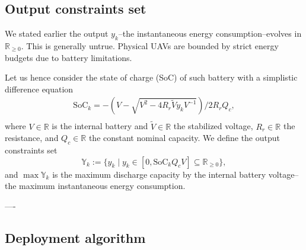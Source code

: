 \documentclass[letterpaper,10pt,conference]{ieeeconf}
\theoremstyle{definition}
\begin{document}
\subsection{Output constraints set}

We stated earlier the output $y_k$--the instantaneous energy consumption--evolves in $\mathbb{R}_{\geq 0}$. This is generally untrue. Physical UAVs are bounded by strict energy budgets due to battery limitations.

Let us hence consider the state of charge (SoC) of such battery with a simplistic difference equation~\cite{seewald2020mechanical}
\begin{equation*}\begin{split}
  \mathrm{SoC}_k=-\left(V-
  \sqrt{
    V^2-
    4R_r\tilde{V}y_kV^{-1}}
  \right)/2R_rQ_c,\\ 
\end{split}\end{equation*}
where $V\in\mathbb{R}$ is the internal battery and $\tilde{V}\in\mathbb{R}$ the stabilized voltage, $R_r\in\mathbb{R}$ the resistance, and $Q_c\in\mathbb{R}$ the constant nominal capacity. We define the output constraints set
\begin{equation*}
  \mathbb{Y}_k:=\{y_k\mid y_k\in[0,\mathrm{SoC}_kQ_cV]\subseteq{\mathbb{R}_{\geq 0}}\},
\end{equation*}
and $\max{\mathbb{Y}}_k$ is the maximum discharge capacity by the internal battery voltage--the maximum instantaneous energy consumption.

----

\subsection{Deployment algorithm}
\end{document}
